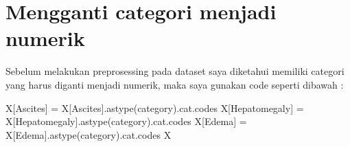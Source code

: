 \documentclass[
  letterpaper,
]{krantz}
\makeatletter
\newenvironment{Shaded}{\begin{snugshade}}{\end{snugshade}}
\newcommand{\NormalTok}[1]{\textcolor[rgb]{0.00,0.23,0.31}{#1}}
\newcommand{\OperatorTok}[1]{\textcolor[rgb]{0.37,0.37,0.37}{#1}}
\newcommand{\StringTok}[1]{\textcolor[rgb]{0.13,0.47,0.30}{#1}}
\newenvironment{kframe}{%
\medskip{}
\setlength{\fboxsep}{.8em}
 \def\at@end@of@kframe{}%
 \ifinner\ifhmode%
  \def\at@end@of@kframe{\end{minipage}}%
  \begin{minipage}{\columnwidth}%
 \fi\fi%
 \def\FrameCommand##1{\hskip\@totalleftmargin \hskip-\fboxsep
 \colorbox{shadecolor}{##1}\hskip-\fboxsep
     \hskip-\linewidth \hskip-\@totalleftmargin \hskip\columnwidth}%
 \MakeFramed {\advance\hsize-\width
   \@totalleftmargin\z@ \linewidth\hsize
   \@setminipage}}%
 {\par\unskip\endMakeFramed%
 \at@end@of@kframe}
\renewenvironment{Shaded}{\begin{kframe}}{\end{kframe}}
\makeatother
\begin{document}
\hypertarget{mengganti-categori-menjadi-numerik}{%
\section*{Mengganti categori menjadi
numerik}\label{mengganti-categori-menjadi-numerik}}


Sebelum melakukan preprosessing pada dataset saya diketahui memiliki
categori yang harus diganti menjadi numerik, maka saya gunakan code
seperti dibawah :

\begin{Shaded}
\begin{Highlighting}[]
\NormalTok{X[}\StringTok{\textquotesingle{}Ascites\textquotesingle{}}\NormalTok{] }\OperatorTok{=}\NormalTok{ X[}\StringTok{\textquotesingle{}Ascites\textquotesingle{}}\NormalTok{].astype(}\StringTok{\textquotesingle{}category\textquotesingle{}}\NormalTok{).cat.codes}
\NormalTok{X[}\StringTok{\textquotesingle{}Hepatomegaly\textquotesingle{}}\NormalTok{] }\OperatorTok{=}\NormalTok{ X[}\StringTok{\textquotesingle{}Hepatomegaly\textquotesingle{}}\NormalTok{].astype(}\StringTok{\textquotesingle{}category\textquotesingle{}}\NormalTok{).cat.codes}
\NormalTok{X[}\StringTok{\textquotesingle{}Edema\textquotesingle{}}\NormalTok{] }\OperatorTok{=}\NormalTok{ X[}\StringTok{\textquotesingle{}Edema\textquotesingle{}}\NormalTok{].astype(}\StringTok{\textquotesingle{}category\textquotesingle{}}\NormalTok{).cat.codes}
\NormalTok{X}
\end{Highlighting}
\end{Shaded}
\end{document}
